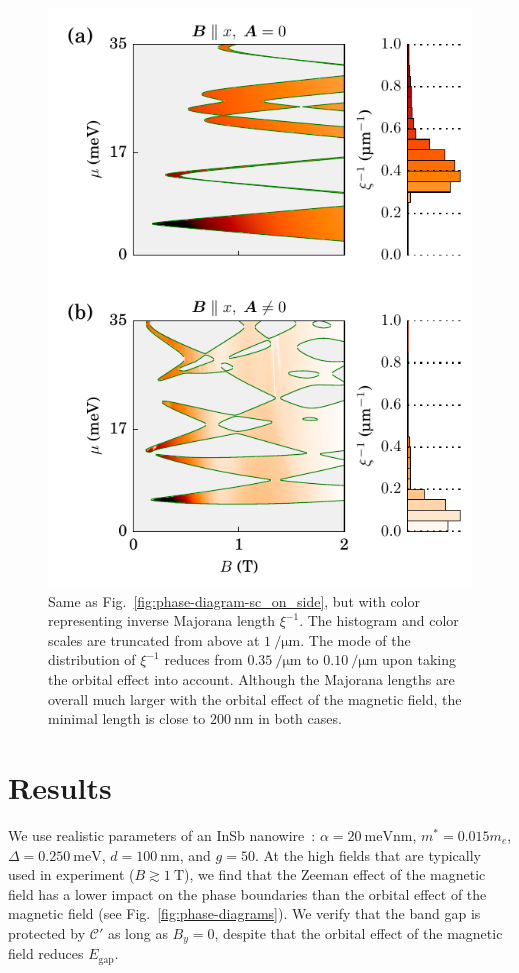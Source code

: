\begin{figure}
\begin{center}
\includegraphics[width=0.7\columnwidth]{chapter_orbitalfield/figures/sc_on_side_length}
\caption{Same as Fig.~\ref{fig:phase-diagram-sc_on_side}, but with color representing inverse Majorana length $\xi^{-1}$.
The histogram and color scales are truncated from above at $\SI{1}{\per\micro\metre}$.
The mode of the distribution of $\xi^{-1}$ reduces from $\SI{0.35}{\per\micro\metre}$ to $\SI{0.10}{\per\micro\metre}$ upon taking the orbital effect into account.
Although the Majorana lengths are overall much larger with the orbital effect of the magnetic field, the minimal length is close to $\SI{200}{\nano\metre}$ in both cases.\label{fig:Majorana-length}}
\end{center}
\end{figure}

\section{Results}


We use realistic parameters of an InSb nanowire~\cite{Mourik2012}: $\alpha=\SI{20}{\milli\electronvolt \nano\metre}$, $m^{*}=0.015m_e$, $\Delta=\SI{0.250}{\milli\electronvolt}$, $d=\SI{100}{\nano\metre}$, and $g=50$.
At the high fields that are typically used in experiment ($B \gtrsim \SI{1}{\tesla}$), we find that the Zeeman effect of the magnetic field has a lower impact on the phase boundaries than the orbital effect of the magnetic field (see Fig.~\ref{fig:phase-diagrams}).
We verify that the band gap is protected by $\mathcal{C}'$ as long as $B_y = 0$, despite that the orbital effect of the magnetic field reduces $E_\textrm{gap}$.

